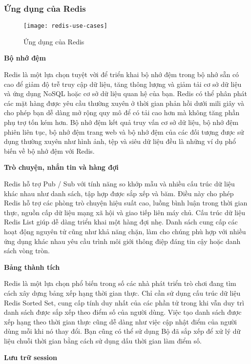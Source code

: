 \subsubsection{Ứng dụng của Redis}

\begin{figure}[H]
	\centering
	\texttt{[image: redis-use-cases]}
	\caption{Ứng dụng của Redis}
\end{figure}

\textbf{Bộ nhớ đệm}

Redis là một lựa chọn tuyệt vời để triển khai bộ nhớ đệm trong bộ nhớ sẵn có cao để giảm độ trễ truy cập dữ liệu, tăng thông lượng và giảm tải cơ sở dữ liệu và ứng dụng NoSQL hoặc cơ sở dữ liệu quan hệ của bạn. Redis có thể phân phát các mặt hàng được yêu cầu thường xuyên ở thời gian phản hồi dưới mili giây và cho phép bạn dễ dàng mở rộng quy mô để có tải cao hơn mà không tăng phần phụ trợ tốn kém hơn. Bộ nhớ đệm kết quả truy vấn cơ sở dữ liệu, bộ nhớ đệm phiên liên tục, bộ nhớ đệm trang web và bộ nhớ đệm của các đối tượng được sử dụng thường xuyên như hình ảnh, tệp và siêu dữ liệu đều là những ví dụ phổ biến về bộ nhớ đệm với Redis.

\textbf{Trò chuyện, nhắn tin và hàng đợi}

Redis hỗ trợ Pub / Sub với tính năng so khớp mẫu và nhiều cấu trúc dữ liệu khác nhau như danh sách, tập hợp được sắp xếp và băm. Điều này cho phép Redis hỗ trợ các phòng trò chuyện hiệu suất cao, luồng bình luận trong thời gian thực, nguồn cấp dữ liệu mạng xã hội và giao tiếp liên máy chủ. Cấu trúc dữ liệu Redis List giúp dễ dàng triển khai một hàng đợi nhẹ. Danh sách cung cấp các hoạt động nguyên tử cũng như khả năng chặn, làm cho chúng phù hợp với nhiều ứng dụng khác nhau yêu cầu trình môi giới thông điệp đáng tin cậy hoặc danh sách vòng tròn.

\textbf{Bảng thành tích}

Redis là một lựa chọn phổ biến trong số các nhà phát triển trò chơi đang tìm cách xây dựng bảng xếp hạng thời gian thực. Chỉ cần sử dụng cấu trúc dữ liệu Redis Sorted Set, cung cấp tính duy nhất của các phần tử trong khi vẫn duy trì danh sách được sắp xếp theo điểm số của người dùng. Việc tạo danh sách được xếp hạng theo thời gian thực cũng dễ dàng như việc cập nhật điểm của người dùng mỗi khi nó thay đổi. Bạn cũng có thể sử dụng Bộ đã sắp xếp để xử lý dữ liệu chuỗi thời gian bằng cách sử dụng dấu thời gian làm điểm số.

\textbf{Lưu trữ session}

